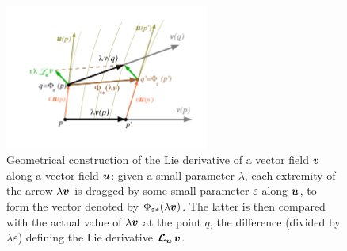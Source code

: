 \begin{figure}
\centerline{\includegraphics[width=0.6\textwidth]{bas_lie_deriv.pdf}}
\caption[]{\label{f:bas:deriv}
\footnotesize
Geometrical construction of the Lie derivative of a
vector field $\bm{v}$ along a vector field $\bm{u}$:
given a small parameter $\lambda$, each extremity of the arrow
$\lambda\bm{v}$ is dragged by some small parameter $\varepsilon$
along $\bm{u}$, to form
the vector denoted by $\Phi_{\varepsilon*}(\lambda\bm{v})$. The latter is then compared with
the actual value of $\lambda\bm{v}$ at the point $q$, the difference (divided
by $\lambda\varepsilon$) defining the Lie derivative $\bm{\mathcal{L}}_{\bm{u}}\,\bm{v}$.}
\end{figure}


